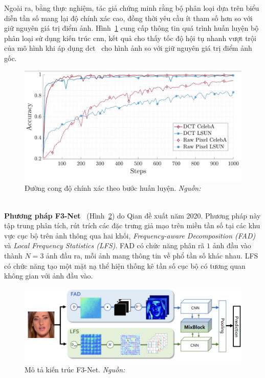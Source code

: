 Ngoài ra, bằng thực nghiệm, tác giả chứng minh rằng bộ phân loại dựa trên biểu diễn tần số mang lại độ chính xác cao, đồng thời yêu cầu ít tham số hơn so với giữ nguyên giá trị điểm ảnh. Hình~\ref{fig:frank-acc-comparison-1} cung cấp thông tin quá trình huấn luyện bộ phân loại sử dụng kiến trúc \gls{cnn}, kết quả cho thấy tốc độ hội tụ nhanh vượt trội của mô hình khi áp dụng \gls{dct}~\cite{1672377} cho hình ảnh so với giữ nguyên giá trị điểm ảnh gốc.
%
\begin{figure}[h]
	\centering
	\includegraphics[width=1.0\linewidth]{Images/frank-acc-comparison-1.png}
	\begin{minipage}{0.9\linewidth}
		\caption{Đường cong độ chính xác theo bước huấn luyện. \textit{Nguồn: \cite{Frank2020LeveragingFA}}}
		\label{fig:frank-acc-comparison-1}
	\end{minipage}
\end{figure}\\
%
%
%
\textbf{Phương pháp F3-Net}~\cite{Qian2020ThinkingIF} (Hình~\ref{fig:model-f3-net-1}) do Qian đề xuất năm 2020.
Phương pháp này tập trung phân tích, rút trích các đặc trưng giả mạo trên miền tần số tại các khu vực cục bộ trên ảnh thông qua hai khối, \textit{Frequency-aware Decomposition (FAD)} và \textit{Local Frequency Statistics (LFS)}. FAD có chức năng phân rã $1$ ảnh đầu vào thành $N=3$ ảnh đầu ra, mỗi ảnh mang thông tin về phổ tần số khác nhau. LFS có chức năng tạo một mặt nạ thể hiện thống kê tần số cục bộ có tương quan không gian với ảnh đầu vào.
\begin{figure}[h]
	\centering
	\includegraphics[width=1.0\linewidth]{Images/model-f3-net-1.png}
	\begin{minipage}{0.9\linewidth}
		\caption{Mô tả kiến trúc F3-Net. \textit{Nguồn: \cite{Qian2020ThinkingIF}}}
		\label{fig:model-f3-net-1}
	\end{minipage}
\end{figure}\\
